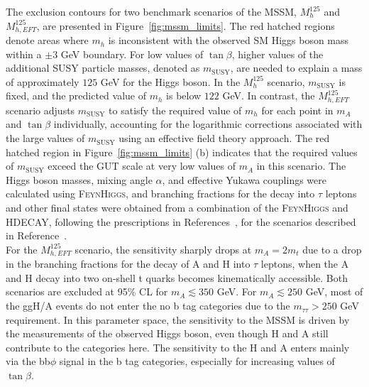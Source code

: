 The exclusion contours for two benchmark scenarios of the \ac{MSSM}, $M_{h}^{125}$ and $M_{h,EFT}^{125}$, are presented in Figure~\ref{fig:mssm_limits}. 
The red hatched regions denote areas where $m_{h}$ is inconsistent with the observed \ac{SM} Higgs boson mass within a ${\pm}3$ GeV boundary. 
For low values of $\tan\beta$, higher values of the additional SUSY particle masses, denoted as $m_{\text{SUSY}}$, are needed to explain a mass of approximately $125$ GeV for the Higgs boson. 
In the $M_{h}^{125}$ scenario, $m_{\text{SUSY}}$ is fixed, and the predicted value of $m_{h}$ is below $122$ GeV. 
In contrast, the $M_{h,EFT}^{125}$ scenario adjusts $m_{\text{SUSY}}$ to satisfy the required value of $m_{h}$ for each point in $m_{A}$ and $\tan\beta$ individually, accounting for the logarithmic corrections associated with the large values of $m_{\text{SUSY}}$ using an effective field theory approach. 
The red hatched region in Figure~\ref{fig:mssm_limits} (b) indicates that the required values of $m_{\text{SUSY}}$ exceed the GUT scale at very low values of $m_{A}$ in this scenario. 
The Higgs boson masses, mixing angle $\alpha$, and effective Yukawa couplings were calculated using \textsc{FeynHiggs}, and branching fractions for the decay into $\tau$ leptons and other final states were obtained from a combination of the \textsc{FeynHiggs} and \textsc{HDECAY}, following the prescriptions in References~\cite{LHCHiggsCrossSectionWorkingGroup:2013rie,deFlorian:2016spz,Denner:2011mq}, for the scenarios described in Reference~\cite{Bagnaschi:2791954}. \\

For the $M_{h,EFT}^{125}$ scenario, the sensitivity sharply drops at $m_{A}=2m_{t}$ due to a drop in the branching fractions for the decay of A and H into $\tau$ leptons, when the A and H decay into two on-shell t quarks becomes kinematically accessible. 
Both scenarios are excluded at 95\% CL for $m_{A}\lesssim350$ GeV. 
For $m_{A}\lesssim250$ GeV, most of the ggH/A events do not enter the no b tag categories due to the $m_{\tau\tau}>250$ GeV requirement. 
In this parameter space, the sensitivity to the \ac{MSSM} is driven by the measurements of the observed Higgs boson, even though H and A still contribute to the categories here. 
The sensitivity to the H and A enters mainly via the bb$\phi$ signal in the b tag categories, especially for increasing values of $\tan\beta$. \\

